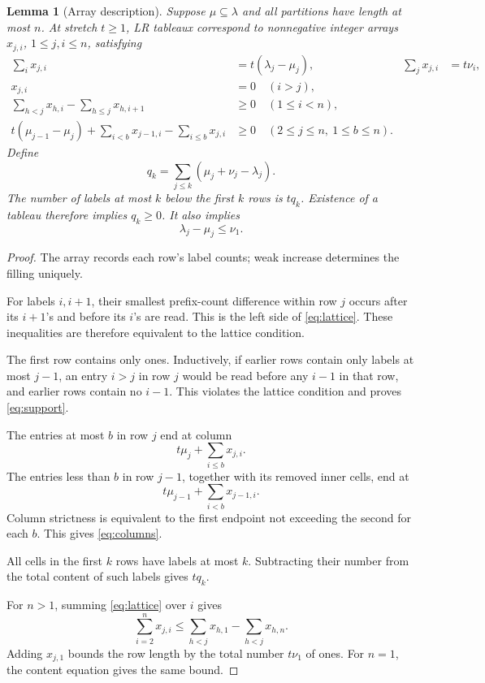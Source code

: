 \documentclass[11pt]{article}
\newtheorem{lemma}[theorem]{Lemma}
\begin{document}
\begin{lemma}[Array description]\label{lem:arrays}
Suppose \(\mu\subseteq\lambda\) and all partitions have length at most \(n\). At stretch \(t\ge1\), LR tableaux correspond to nonnegative integer arrays \(x_{j,i}\), \(1\le j,i\le n\), satisfying
\begin{align}
\sum_i x_{j,i}&=t(\lambda_j-\mu_j),
&
\sum_j x_{j,i}&=t\nu_i,                                      \label{eq:margins}\\
x_{j,i}&=0\quad(i>j),                                        \label{eq:support}\\
\sum_{h<j}x_{h,i}-\sum_{h\le j}x_{h,i+1}&\ge0
\quad(1\le i<n),                                            \label{eq:lattice}\\
t(\mu_{j-1}-\mu_j)+\sum_{i<b}x_{j-1,i}
-\sum_{i\le b}x_{j,i}&\ge0
\quad(2\le j\le n,\ 1\le b\le n).                            \label{eq:columns}
\end{align}
Define
\[
q_k=\sum_{j\le k}(\mu_j+\nu_j-\lambda_j).
\]
The number of labels at most \(k\) below the first \(k\) rows is \(tq_k\). Existence of a tableau therefore implies \(q_k\ge0\). It also implies
\[
\lambda_j-\mu_j\le\nu_1.
                                                               \tag{5}
\]
\end{lemma}

\begin{proof}
The array records each row's label counts; weak increase determines the filling uniquely.

For labels \(i,i+1\), their smallest prefix-count difference within row \(j\) occurs after its \(i+1\)'s and before its \(i\)'s are read. This is the left side of \eqref{eq:lattice}. These inequalities are therefore equivalent to the lattice condition.

The first row contains only ones. Inductively, if earlier rows contain only labels at most \(j-1\), an entry \(i>j\) in row \(j\) would be read before any \(i-1\) in that row, and earlier rows contain no \(i-1\). This violates the lattice condition and proves \eqref{eq:support}.

The entries at most \(b\) in row \(j\) end at column
\[
t\mu_j+\sum_{i\le b}x_{j,i}.
\]
The entries less than \(b\) in row \(j-1\), together with its removed inner cells, end at
\[
t\mu_{j-1}+\sum_{i<b}x_{j-1,i}.
\]
Column strictness is equivalent to the first endpoint not exceeding the second for each \(b\). This gives \eqref{eq:columns}.

All cells in the first \(k\) rows have labels at most \(k\). Subtracting their number from the total content of such labels gives \(tq_k\).

For \(n>1\), summing \eqref{eq:lattice} over \(i\) gives
\[
\sum_{i=2}^n x_{j,i}
\le \sum_{h<j}x_{h,1}-\sum_{h<j}x_{h,n}.
\]
Adding \(x_{j,1}\) bounds the row length by the total number \(t\nu_1\) of ones. For \(n=1\), the content equation gives the same bound.
\end{proof}
\end{document}
